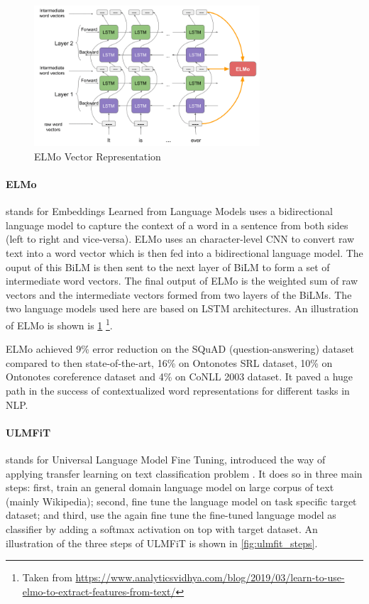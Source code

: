 \begin{figure}
    \centering
    \includegraphics[width=0.75\textwidth]{images/elmo.png}
    \caption{ELMo Vector Representation}
    \label{fig:elmo}
\end{figure}

\paragraph{ELMo} stands for Embeddings Learned from Language Models \cite{peters2018deep} uses a bidirectional language model to capture the context of a word in a sentence from both sides (left to right and vice-versa). ELMo uses an character-level CNN to convert raw text into a word vector which is then fed into a bidirectional language model. The ouput of this BiLM is then sent to the next layer of BiLM to form a set of intermediate word vectors. The final output of ELMo is the weighted sum of raw vectors and the intermediate vectors formed from two layers of the BiLMs. The two language models used here are based on LSTM architectures. An illustration of ELMo is shown is \cref{fig:elmo} \footnote{Taken from \url{https://www.analyticsvidhya.com/blog/2019/03/learn-to-use-elmo-to-extract-features-from-text/}}.

ELMo achieved 9\% error reduction on the SQuAD (question-answering) dataset compared to then state-of-the-art, 16\% on Ontonotes SRL dataset, 10\% on Ontonotes coreference dataset and 4\% on CoNLL 2003 dataset. It paved a huge path in the success of contextualized word representations for different tasks in NLP.

\paragraph{ULMFiT} stands for Universal Language Model Fine Tuning, introduced the way of applying transfer learning on text classification problem \cite{howard2018universal}. It does so in three main steps: first, train an general domain language model on large corpus of text (mainly Wikipedia); second, fine tune the language model on task specific target dataset; and third, use the again fine tune the fine-tuned language model as classifier by adding a softmax activation on top with target dataset. An illustration of the three steps of ULMFiT is shown in \cref{fig:ulmfit_steps}.

